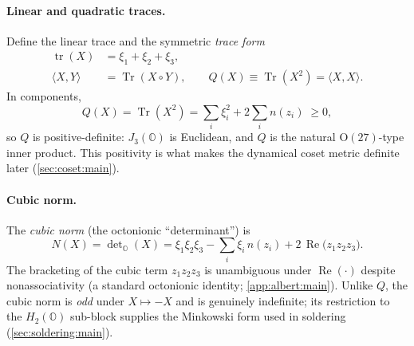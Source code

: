\documentclass[11pt]{article}
\theoremstyle{plain}
\theoremstyle{definition}
\theoremstyle{remark}
\begin{document}
\paragraph{Linear and quadratic traces.}
Define the linear trace and the symmetric \emph{trace form}
\begin{align}
  \operatorname{tr}(X) &= \xi_{1}+\xi_{2}+\xi_{3},
  \label{eq:albert:lintrace}\\[2pt]
  \langle X,Y\rangle &= \operatorname{Tr}(X\circ Y),
  \qquad
  Q(X)\equiv \operatorname{Tr}(X^{2})=\langle X,X\rangle .
  \label{eq:albert:traceform}
\end{align}
In components,
\begin{equation}\label{eq:albert:Qcomp}
  Q(X)=\operatorname{Tr}(X^{2})
  =\sum_{i}\xi_{i}^{2}+2\sum_{i} n(z_{i}) \;\ge 0 ,
\end{equation}
so $Q$ is positive-definite: $J_{3}(\mathbb{O})$ is Euclidean, and $Q$ is
the natural $\mathrm{O}(27)$-type inner product. This positivity is what
makes the dynamical coset metric definite later
(\autoref{sec:coset:main}).

\paragraph{Cubic norm.}
The \emph{cubic norm} (the octonionic ``determinant'') is
\begin{equation}\label{eq:albert:Ndef}
  N(X)=\det\nolimits_{\mathbb{O}}(X)
  =\xi_{1}\xi_{2}\xi_{3}
   -\sum_{i}\xi_{i}\,n(z_{i})
   +2\,\operatorname{Re}\!\bigl(z_{1}z_{2}z_{3}\bigr).
\end{equation}
The bracketing of the cubic term $z_{1}z_{2}z_{3}$ is unambiguous under
$\operatorname{Re}(\cdot)$ despite nonassociativity (a standard
octonionic identity; \autoref{app:albert:main}). Unlike $Q$, the cubic
norm is \emph{odd} under $X\mapsto -X$ and is genuinely indefinite; its
restriction to the $H_{2}(\mathbb{O})$ sub-block supplies the Minkowski
form used in soldering (\autoref{sec:soldering:main}).
\end{document}
